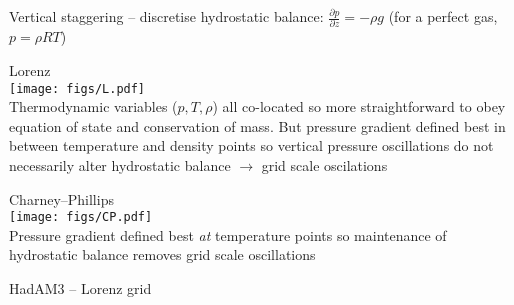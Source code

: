 \begin{slide}

\begin{list1}
\item Vertical staggering -- discretise hydrostatic balance: $\frac{\partial p}{\partial z} = -\rho g$ (for a perfect gas, $p = \rho RT$)

\begin{minipage}[t]{0.48\linewidth}\raggedright
{\centering
Lorenz \\
\texttt{[image: figs/L.pdf]}
}\\
Thermodynamic variables ($p, T, \rho$) all co-located so more straightforward to obey equation of state and conservation of mass. But pressure gradient defined best in between temperature and density points so vertical pressure oscillations do not necessarily alter hydrostatic balance $\rightarrow$ grid scale oscilations
\end{minipage}
\hfill
\begin{minipage}[t]{0.48\linewidth}\raggedright
{\centering
Charney--Phillips \\
\texttt{[image: figs/CP.pdf]}
}\\
Pressure gradient defined best {\it at} temperature points so maintenance of hydrostatic balance removes grid scale oscillations
\end{minipage}

\item HadAM3 -- Lorenz grid

\end{list1}

\end{slide}

